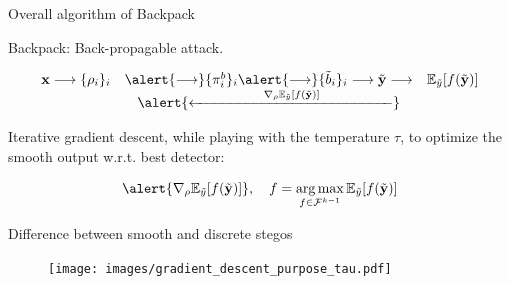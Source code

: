\documentclass[10pt,aspectratio=169]{beamer}
\DeclareMathOperator*{\argmax}{arg\,max}
\begin{document}
\begin{frame}{Overall algorithm of Backpack}


\alert{Backpack}: \alert{Back-p}ropagable att\alert{ack}.

\begin{equation*}
    \begin{array}{ccc}
        \mathbf{x} \longrightarrow \{\rho_i\}_i & \alert{\longrightarrow}  \{\pi_i^b\}_i    \alert{\longrightarrow} \{\tilde{b}_i\}_i \longrightarrow  \tilde{\mathbf{y}}  \longrightarrow  & \mathbb{E}_{\tilde{y}}[f(\tilde{\mathbf{y}})] \\
        & \alert{\xleftarrow{\hspace{5em} \nabla_\rho \mathbb{E}_{\tilde{y}} [f(\tilde{\mathbf{y}})]\hspace{5em}}} 
    \end{array}
\end{equation*}

\pause

Iterative gradient descent, while playing with the temperature $\tau$, to optimize the smooth output w.r.t. best detector:

\begin{equation}
    \alert{\nabla_\rho \mathbb{E}_{\tilde{y}} [f(\tilde{\mathbf{y}})]}, \quad  f = \argmax_{f \in \mathcal{F}^{k-1}} \mathbb{E}_{\tilde{y}} [f(\tilde{\mathbf{y}})]
\end{equation}


\end{frame}

\begin{frame}{Difference between smooth and discrete stegos}
    \begin{figure}[h]
        \texttt{[image: images/gradient\_descent\_purpose\_tau.pdf]}
    \end{figure}
\end{frame}
\end{document}
